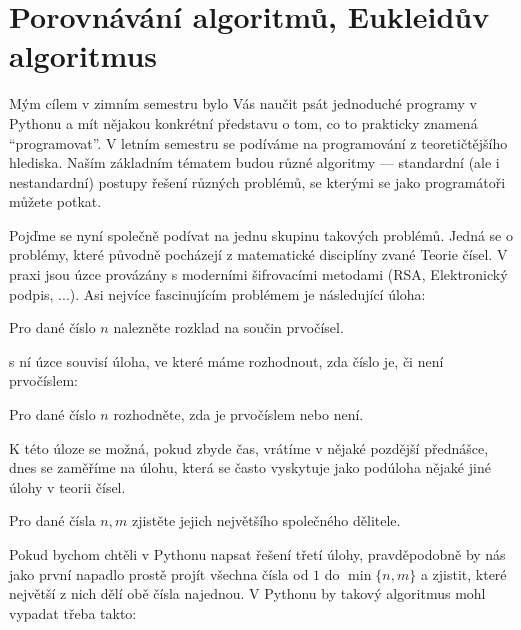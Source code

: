 \ifx\ucebnice\undefined

\setcounter{section}{0}
\fi
\section{Porovnávání algoritmů, Eukleidův algoritmus}

Mým cílem v zimním semestru bylo Vás naučit psát jednoduché programy v Pythonu a mít nějakou konkrétní představu o tom,
co to prakticky znamená ``programovat''. V letním semestru se podíváme na programování z teoretičtějšího hlediska.
Naším základním tématem budou různé algoritmy --- standardní (ale i nestandardní) postupy řešení různých problémů, 
se kterými se jako programátoři můžete potkat. 

Pojďme se nyní společně podívat na jednu skupinu takových problémů. Jedná se o problémy, které původně pocházejí z
matematické disciplíny zvané Teorie čísel. V praxi jsou úzce provázány s moderními šifrovacími metodami 
(RSA, Elektronický podpis, ...). Asi nejvíce fascinujícím problémem je následující úloha:

\begin{ukol}
Pro dané číslo $n$ nalezněte rozklad na součin prvočísel.
\end{ukol}

s ní úzce souvisí úloha, ve které máme rozhodnout, zda číslo je, či není prvočíslem:

\begin{ukol}
Pro dané číslo $n$ rozhodněte, zda je prvočíslem nebo není.
\end{ukol}

K této úloze se možná, pokud zbyde čas, vrátíme v nějaké pozdější přednášce, dnes se zaměříme na úlohu,
která se často vyskytuje jako podúloha nějaké jiné úlohy v teorii čísel. 

\begin{ukol}
Pro dané čísla $n,m$ zjistěte jejich největšího společného dělitele.
\end{ukol}


Pokud bychom chtěli v Pythonu napsat řešení třetí úlohy, pravděpodobně by nás jako první napadlo prostě
projít všechna čísla od $1$ do $\min \{n,m\}$ a zjistit, které největší z nich dělí obě čísla najednou.
V Pythonu by takový algoritmus mohl vypadat třeba takto:

